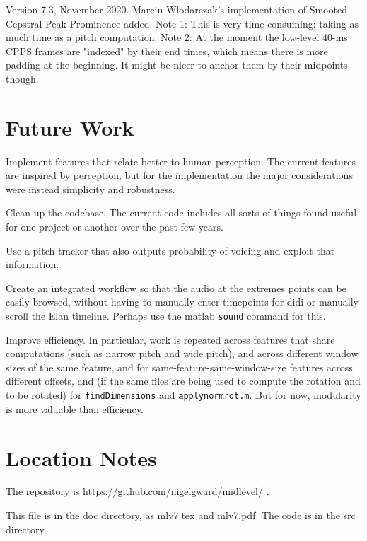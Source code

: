 \documentclass[11pt]{article}
\begin{document}
Version 7.3, November 2020.  Marcin Wlodarczak's implementation of
Smooted Cepstral Peak Prominence added.  Note 1: This is very time
consuming; taking as much time as a pitch computation. Note 2: At the
moment the low-level 40-ms CPPS frames are "indexed" by their end
times, which means there is more padding at the beginning. It might be
nicer to anchor them by their midpoints though.


\section{Future Work}               \label{sec:future}

Implement features that relate better to human perception.  The
current features are inspired by perception, but for the
implementation the major considerations were instead simplicity and
robustness.

Clean up the codebase.  The current code includes all sorts of things
found useful for one project or another over the past few years.

Use a pitch tracker that also outputs probability
of voicing and exploit that information.

Create an integrated workflow so that the audio at the extremes points
can be easily browsed, without having to manually enter timepoints for
didi or manually scroll the Elan timeline.  Perhaps use the matlab
{\tt sound} command for this.

Improve efficiency.  In particular, work is repeated across features
that share computations (such as narrow pitch and wide pitch), and
across different window sizes of the same feature, and for
same-feature-same-window-size features across different offsets, and
(if the same files are being used to compute the rotation and to be
rotated) for {\tt findDimensions} and {\tt applynormrot.m}.  But for
now, modularity is more valuable than efficiency.


%


\section{Location Notes}            \label{sec:location}

The repository is https://github.com/nigelgward/midlevel/ .

This file is in the doc directory, as mlv7.tex and mlv7.pdf.  The code
is in the src directory. 



%

\end{document}
